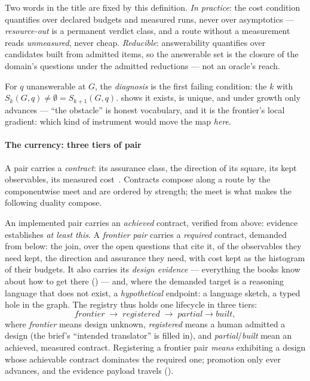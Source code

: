Two words in the title are fixed by this definition.
\emph{In practice}: the cost condition quantifies over declared
budgets and measured runs, never over asymptotics ---
\textit{resource-out} is a permanent verdict class, and a route
without a measurement reads \textit{unmeasured}, never cheap.
\emph{Reducible}: answerability quantifies over candidates built from
admitted items, so the answerable set is the closure of the domain's
questions under the admitted reductions --- not an oracle's reach.

\begin{definition}[Diagnosis]
\label{def:diagnosis}
For $q$ unanswerable at $G$, the \emph{diagnosis} is the first
failing condition: the $k$ with $S_k(G,q) \neq \emptyset =
S_{k+1}(G,q)$.  shows it exists, is unique, and
under growth only advances --- ``the obstacle'' is honest vocabulary,
and it is the frontier's local gradient: which kind of instrument
would move the map \emph{here}.
\end{definition}

\paragraph{The currency: three tiers of pair}
A pair carries a \emph{contract}: its assurance class, the direction
of its square, its kept observables, its measured
cost~\citep{hurdygurdy2026calculus}. Contracts compose along a route
by the componentwise meet and are ordered by strength; the meet is
what makes the following duality compose.

\begin{definition}
\label{def:tiers}
An implemented pair carries an \emph{achieved} contract, verified
from above: evidence establishes \emph{at least this}. A
\emph{frontier pair} carries a \emph{required} contract, demanded
from below: the join, over the open questions that cite it, of the
observables they need kept, the direction and assurance they need,
with cost kept as the histogram of their budgets. It also carries its
\emph{design evidence} --- everything the books know about how to get
there () --- and, where the demanded target is a
reasoning language that does not exist, a \emph{hypothetical}
endpoint: a language sketch, a typed hole in the graph. The registry
thus holds one lifecycle in three tiers:
\[
\textit{frontier} \;\longrightarrow\; \textit{registered}
\;\longrightarrow\; \textit{partial} \rightarrow \textit{built},
\]
where \emph{frontier} means design unknown, \emph{registered} means a
human admitted a design (the brief's ``intended translator'' is
filled in), and \emph{partial}/\emph{built} mean an achieved,
measured contract. Registering a frontier pair \emph{means}
exhibiting a design whose achievable contract dominates the required
one; promotion only ever advances, and the evidence payload travels
().
\end{definition}

